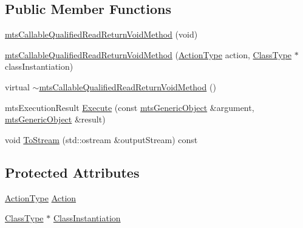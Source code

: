 \subsection*{Public Member Functions}
\begin{DoxyCompactItemize}
\item 
\hyperlink{classmts_callable_qualified_read_return_void_method_a82517eb2351f0065434298d074d6c73e}{mts\+Callable\+Qualified\+Read\+Return\+Void\+Method} (void)
\item 
\hyperlink{classmts_callable_qualified_read_return_void_method_a1d137b2c220e73ca6c1efc1f4842129b}{mts\+Callable\+Qualified\+Read\+Return\+Void\+Method} (\hyperlink{classmts_callable_qualified_read_return_void_method_a90bf5eae1c7fdee0396313ce6de022bb}{Action\+Type} action, \hyperlink{classmts_callable_qualified_read_return_void_method_ae99cfab8208eb374f2cdf01c97edfa3b}{Class\+Type} $\ast$class\+Instantiation)
\item 
virtual \hyperlink{classmts_callable_qualified_read_return_void_method_a7a3d67f45cd55cdba171853ae6484c4f}{$\sim$mts\+Callable\+Qualified\+Read\+Return\+Void\+Method} ()
\item 
mts\+Execution\+Result \hyperlink{classmts_callable_qualified_read_return_void_method_ac347ad8cf790fb4094f9ac9c1d4cc70a}{Execute} (const \hyperlink{classmts_generic_object}{mts\+Generic\+Object} \&argument, \hyperlink{classmts_generic_object}{mts\+Generic\+Object} \&result)
\item 
void \hyperlink{classmts_callable_qualified_read_return_void_method_a269843820d9e3ae43bcdd51b0c5c6190}{To\+Stream} (std\+::ostream \&output\+Stream) const 
\end{DoxyCompactItemize}
\subsection*{Protected Attributes}
\begin{DoxyCompactItemize}
\item 
\hyperlink{classmts_callable_qualified_read_return_void_method_a90bf5eae1c7fdee0396313ce6de022bb}{Action\+Type} \hyperlink{classmts_callable_qualified_read_return_void_method_ac7d58d66c42aa3c1071a121762b2d7fb}{Action}
\item 
\hyperlink{classmts_callable_qualified_read_return_void_method_ae99cfab8208eb374f2cdf01c97edfa3b}{Class\+Type} $\ast$ \hyperlink{classmts_callable_qualified_read_return_void_method_ace93cdd3d5c06f66479ab1e1cd29ece3}{Class\+Instantiation}
\end{DoxyCompactItemize}


